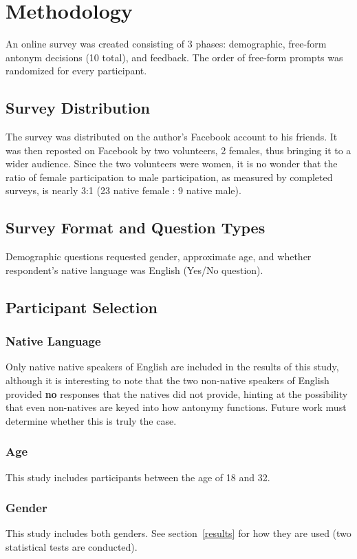 \section {Methodology}
An online survey was created consisting of 3 phases: demographic, free-form antonym decisions (10 total), and feedback.  The order of free-form prompts was randomized for every participant.  %

\subsection{Survey Distribution} The survey was distributed on the author’s Facebook account to his friends.  It was then reposted on Facebook by two volunteers, 2 females, thus bringing it to a wider audience.  Since the two volunteers were women, it is no wonder that the ratio of female participation to male participation, as measured by completed surveys, is nearly 3:1 (23 native female : 9 native male).  

\subsection{Survey Format and Question Types} Demographic questions requested gender, approximate age, and whether respondent’s native language was English (Yes/No question).  

\subsection{Participant Selection}
\subsubsection{Native Language}
Only native native speakers of English are included in the results of this study, although it is interesting to note that the two non-native speakers of English provided \textbf{no} responses that the natives did not provide, hinting at the possibility that even non-natives are keyed into how antonymy functions.  Future work must determine whether this is truly the case.

\subsubsection{Age}
This study includes participants between the age of 18 and 32.

\subsubsection{Gender}
This study includes both genders.  See section~\ref{results} for how they are used (two statistical tests are conducted).  

